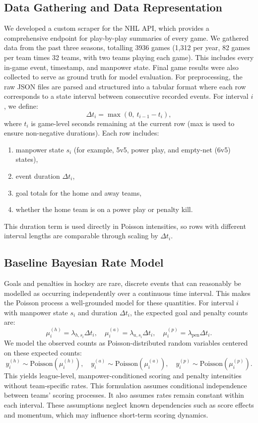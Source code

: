 \documentclass{article}
\begin{document}
\subsection{Data Gathering and Data Representation}
We developed a custom scraper for the NHL API, which provides a comprehensive endpoint for play-by-play summaries of every game. We gathered data from the past three seasons, totalling 3936 games (1,312 per year, 82 games per team times 32 teams, with two teams playing each game). This includes every in-game event, timestamp, and manpower state. Final game results were also collected to serve as ground truth for model evaluation. For preprocessing, the raw JSON files are parsed and structured into a tabular format where each row corresponds to a state interval between consecutive recorded events. For interval $i$, we define:
\[
\Delta t_i = \max(0,\ t_{i-1}-t_i),
\]
where $t_i$ is game-level seconds remaining at the current row (max is used to ensure non-negative durations). Each row includes:
\begin{enumerate}
\item manpower state $s_i$ (for example, 5v5, power play, and empty-net (6v5) states),
\item event duration $\Delta t_i$,
\item goal totals for the home and away teams,
\item whether the home team is on a power play or penalty kill.
\end{enumerate}
This duration term is used directly in Poisson intensities, so rows with different interval lengths are comparable through scaling by \(\Delta t_i\).

\subsection{Baseline Bayesian Rate Model}
Goals and penalties in hockey are rare, discrete events that can reasonably be modelled as occurring independently over a continuous time interval. This makes the Poisson process a well-grounded model for these quantities. For interval $i$ with manpower state $s_i$ and duration $\Delta t_i$, the expected goal and penalty counts are:
\[
\mu^{(h)}_i=\lambda_{h,s_i}\Delta t_i,\quad
\mu^{(a)}_i=\lambda_{a,s_i}\Delta t_i,\quad
\mu^{(p)}_i=\lambda_{\text{pen}}\Delta t_i.
\]
We model the observed counts as Poisson-distributed random variables centered on these expected counts:
\[
y^{(h)}_i\sim\text{Poisson}(\mu^{(h)}_i),\quad
y^{(a)}_i\sim\text{Poisson}(\mu^{(a)}_i),\quad
y^{(p)}_i\sim\text{Poisson}(\mu^{(p)}_i).
\]
This yields league-level, manpower-conditioned scoring and penalty intensities without team-specific rates. This formulation assumes conditional independence between teams’ scoring processes. It also assumes rates remain constant within each interval. These assumptions neglect known dependencies such as score effects and momentum, which may influence short-term scoring dynamics.
\end{document}

